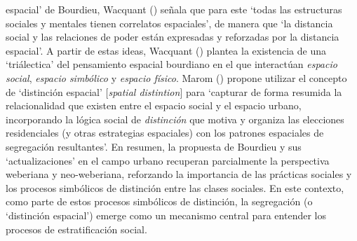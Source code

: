 \documentclass[
  spanish,
  a4paper,%
  chapterprefix=true,%
  DIV=calc,%
  twoside]{scrbook}%
\begin{document}
espacial' de Bourdieu, Wacquant () señala que para este
`todas las estructuras sociales y mentales tienen correlatos
espaciales', de manera que `la distancia social y las relaciones de
poder están expresadas y reforzadas por la distancia espacial'. A partir
de estas ideas, Wacquant () plantea la existencia de una `triálectica'
del pensamiento espacial bourdiano en el que interactúan \emph{espacio
social}, \emph{espacio simbólico} y \emph{espacio físico}. Marom ()
propone utilizar el concepto de `distinción espacial' {[}\emph{spatial
distintion}{]} para `capturar de forma resumida la relacionalidad que
existen entre el espacio social y el espacio urbano, incorporando la
lógica social de \emph{distinción} que motiva y organiza las elecciones
residenciales (y otras estrategias espaciales) con los patrones
espaciales de segregación resultantes'. En resumen, la propuesta de
Bourdieu y sus `actualizaciones' en el campo urbano recuperan
parcialmente la perspectiva weberiana y neo-weberiana, reforzando la
importancia de las prácticas sociales y los procesos simbólicos de
distinción entre las clases sociales. En este contexto, como parte de
estos procesos simbólicos de distinción, la segregación (o `distinción
espacial') emerge como un mecanismo central para entender los procesos
de estratificación social.
\end{document}
